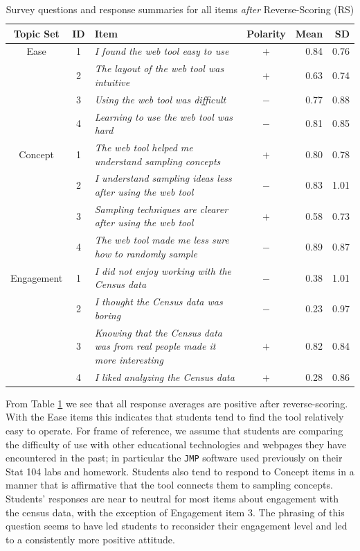 \documentclass{article}\usepackage[]{graphicx}\usepackage[]{color}
\begin{document}
\begin{table}[ht]
\centering
\begin{tabular}{ccp{3.4in}crr}
Topic Set & ID & Item & Polarity & Mean & SD\\[3pt]
  \hline
Ease & 1 & \it I found the web tool easy to use & $+$ & 0.84 & 0.76\\  
 & 2 & \it The layout of the web tool was intuitive & $+$  & 0.63 & 0.74\\  
 & 3 & \it Using the web tool was difficult & $-$  & 0.77& 0.88\\  
 & 4 & \it Learning to use the web tool was hard & $-$  & 0.81 & 0.85\\  [3pt]
  \hline
Concept & 1 & \it The web tool helped me understand sampling concepts & $+$  & 0.80& 0.78\\   
& 2 & \it I understand sampling ideas less after using the web tool & $-$  & 0.83& 1.01\\  
& 3 & \it Sampling techniques are clearer after using the web tool & $+$  & 0.58& 0.73\\  
& 4 & \it The web tool made me less sure how to randomly sample & $-$  & 0.89& 0.87\\  
   \hline
Engagement & 1 & \it I did not enjoy working with the Census data & $-$  & 0.38 & 1.01\\  
& 2 & \it I thought the Census data was boring & $-$   & 0.23& 0.97\\  
& 3 & \it Knowing that the Census data was from real people made it more interesting & $+$  & 0.82& 0.84\\   
& 4 & \it I liked analyzing the Census data & $+$  & 0.28 & 0.86\\   
\end{tabular}
\caption{Survey questions and response summaries for all items \textit{after} Reverse-Scoring (RS)}
\label{tab:surveyquestions}
\end{table}

\normalsize



From Table \ref{tab:surveyquestions} we see that all response averages are positive after reverse-scoring. With the Ease items this indicates that students tend to find the tool relatively easy to operate. For frame of reference, we assume that students are comparing the difficulty of use with other educational technologies and webpages they have encountered in the past; in particular the \texttt{JMP} software used previously on their Stat 104 labs and homework. Students also tend to respond to Concept items in a manner that is affirmative that the tool connects them to sampling concepts. Students' responses are near to neutral for most items about engagement with the census data, with the exception of Engagement item 3.  The phrasing of this question seems to have led students to reconsider their engagement level and led to a consistently more positive attitude.
\end{document}
